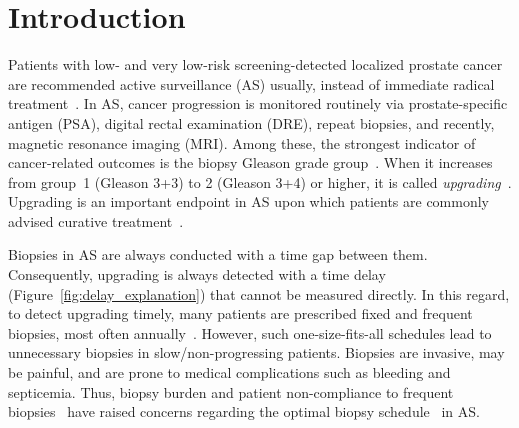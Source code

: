 
\section{Introduction}
Patients with low- and very low-risk screening-detected localized prostate cancer are recommended active surveillance (AS) usually, instead of immediate radical treatment~\citep{briganti2018active}. In AS, cancer progression is monitored routinely via prostate-specific antigen (PSA), digital rectal examination (DRE), repeat biopsies, and recently, magnetic resonance imaging (MRI). Among these, the strongest indicator of cancer-related outcomes is the biopsy Gleason grade group~\citep{epsteinGG2014}. When it increases from group~1 (Gleason 3+3) to 2 (Gleason 3+4) or higher, it is called \emph{upgrading}~\citep{bruinsma2017expert}. Upgrading is an important endpoint in AS upon which patients are commonly advised curative treatment~\citep{bul2013active}.

Biopsies in AS are always conducted with a time gap between them. Consequently, upgrading is always detected with a time delay (Figure~\ref{fig:delay_explanation}) that cannot be measured directly. In this regard, to detect upgrading timely, many patients are prescribed fixed and frequent biopsies, most often annually~\cite{loeb2014heterogeneity}. However, such one-size-fits-all schedules lead to unnecessary biopsies in slow/non-progressing patients. Biopsies are invasive, may be painful, and are prone to medical complications such as bleeding and septicemia\citep{loeb2013systematic}. Thus, biopsy burden and patient non-compliance to frequent biopsies~\citep{bokhorst2015compliance} have raised concerns regarding the optimal biopsy schedule~\citep{inoue2018comparative, bratt2013study} in AS.

